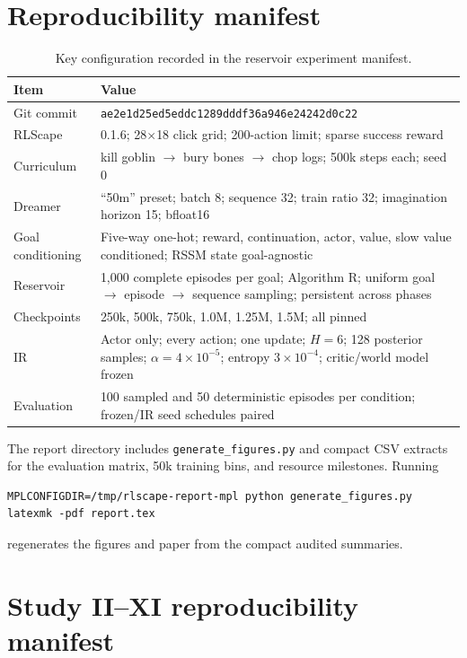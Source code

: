 \documentclass[10pt]{article}
\begin{document}
\section{Reproducibility manifest}

\begin{table}[H]
\centering
\small
\caption{Key configuration recorded in the reservoir experiment manifest.}
\begin{tabular}{>{\raggedright\arraybackslash}p{.28\linewidth}p{.62\linewidth}}
\toprule
Item & Value \\
\midrule
Git commit & \texttt{ae2e1d25ed5eddc1289dddf36a946e24242d0c22} \\
RLScape & 0.1.6; 28$\times$18 click grid; 200-action limit; sparse success reward \\
Curriculum & kill goblin $\rightarrow$ bury bones $\rightarrow$ chop logs; 500k steps each; seed 0 \\
Dreamer & ``50m'' preset; batch 8; sequence 32; train ratio 32; imagination horizon 15; bfloat16 \\
Goal conditioning & Five-way one-hot; reward, continuation, actor, value, slow value conditioned; RSSM state goal-agnostic \\
Reservoir & 1,000 complete episodes per goal; Algorithm R; uniform goal $\rightarrow$ episode $\rightarrow$ sequence sampling; persistent across phases \\
Checkpoints & 250k, 500k, 750k, 1.0M, 1.25M, 1.5M; all pinned \\
IR & Actor only; every action; one update; $H=6$; 128 posterior samples; $\alpha=4\times10^{-5}$; entropy $3\times10^{-4}$; critic/world model frozen \\
Evaluation & 100 sampled and 50 deterministic episodes per condition; frozen/IR seed schedules paired \\
\bottomrule
\end{tabular}
\end{table}

The report directory includes \texttt{generate\_figures.py} and compact CSV extracts for the evaluation matrix, 50k training bins, and resource milestones. Running
\begin{verbatim}
MPLCONFIGDIR=/tmp/rlscape-report-mpl python generate_figures.py
latexmk -pdf report.tex
\end{verbatim}
regenerates the figures and paper from the compact audited summaries.

\section{Study II--XI reproducibility manifest}
\end{document}
